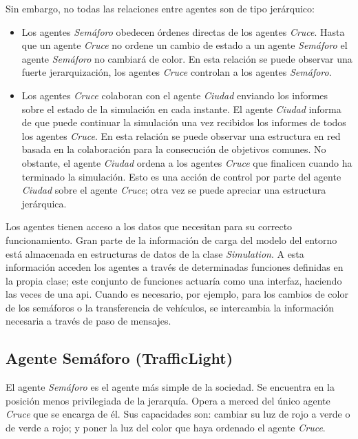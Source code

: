 Sin embargo, no todas las relaciones entre agentes son de tipo jerárquico:
\begin{itemize}
    \item Los agentes \textit{Semáforo} obedecen órdenes directas de los agentes \textit{Cruce}. Hasta que un agente \textit{Cruce} no ordene un cambio de estado a un agente \textit{Semáforo} el agente \textit{Semáforo} no cambiará de color. En esta relación se puede observar una fuerte jerarquización, los agentes \textit{Cruce} controlan a los agentes \textit{Semáforo}.
    \item Los agentes \textit{Cruce} colaboran con el agente \textit{Ciudad} enviando los informes sobre el estado de la simulación en cada instante. El agente \textit{Ciudad} informa de que puede continuar la simulación una vez recibidos los informes de todos los agentes \textit{Cruce}. En esta relación se puede observar una estructura en red basada en la colaboración para la consecución de objetivos comunes. No obstante, el agente \textit{Ciudad} ordena a los agentes \textit{Cruce} que finalicen cuando ha terminado la simulación. Esto es una acción de control por parte del agente \textit{Ciudad} sobre el agente \textit{Cruce}; otra vez se puede apreciar una estructura jerárquica.
\end{itemize}

Los agentes tienen acceso a los datos que necesitan para su correcto funcionamiento. Gran parte de la información de carga del modelo del entorno está almacenada en estructuras de datos de la clase \textit{Simulation}. A esta información acceden los agentes a través de determinadas funciones definidas en la propia clase; este conjunto de funciones actuaría como una interfaz, haciendo las veces de una \acrshort{api}. Cuando es necesario, por ejemplo, para los cambios de color de los semáforos o la transferencia de vehículos, se intercambia la información necesaria a través de paso de mensajes.

\newpage
\subsection{Agente Semáforo (TrafficLight)}
El agente \textit{Semáforo} es el agente más simple de la sociedad. Se encuentra en la posición menos privilegiada de la jerarquía. Opera a merced del único agente \textit{Cruce} que se encarga de él. Sus capacidades son: cambiar su luz de rojo a verde o de verde a rojo; y poner la luz del color que haya ordenado el agente \textit{Cruce}. 

